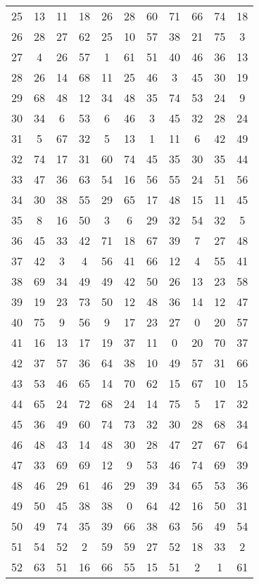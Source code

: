 \begin{table}
\begin{tabular}{c c c c c c c c c c c }
25 & 13 & 11 & 18 & 26 & 28 & 60 & 71 & 66 & 74 & 18 \\
26 & 28 & 27 & 62 & 25 & 10 & 57 & 38 & 21 & 75 & 3 \\
27 & 4 & 26 & 57 & 1 & 61 & 51 & 40 & 46 & 36 & 13 \\
28 & 26 & 14 & 68 & 11 & 25 & 46 & 3 & 45 & 30 & 19 \\
29 & 68 & 48 & 12 & 34 & 48 & 35 & 74 & 53 & 24 & 9 \\
30 & 34 & 6 & 53 & 6 & 46 & 3 & 45 & 32 & 28 & 24 \\
31 & 5 & 67 & 32 & 5 & 13 & 1 & 11 & 6 & 42 & 49 \\
32 & 74 & 17 & 31 & 60 & 74 & 45 & 35 & 30 & 35 & 44 \\
33 & 47 & 36 & 63 & 54 & 16 & 56 & 55 & 24 & 51 & 56 \\
34 & 30 & 38 & 55 & 29 & 65 & 17 & 48 & 15 & 11 & 45 \\
35 & 8 & 16 & 50 & 3 & 6 & 29 & 32 & 54 & 32 & 5 \\
36 & 45 & 33 & 42 & 71 & 18 & 67 & 39 & 7 & 27 & 48 \\
37 & 42 & 3 & 4 & 56 & 41 & 66 & 12 & 4 & 55 & 41 \\
38 & 69 & 34 & 49 & 49 & 42 & 50 & 26 & 13 & 23 & 58 \\
39 & 19 & 23 & 73 & 50 & 12 & 48 & 36 & 14 & 12 & 47 \\
40 & 75 & 9 & 56 & 9 & 17 & 23 & 27 & 0 & 20 & 57 \\
41 & 16 & 13 & 17 & 19 & 37 & 11 & 0 & 20 & 70 & 37 \\
42 & 37 & 57 & 36 & 64 & 38 & 10 & 49 & 57 & 31 & 66 \\
43 & 53 & 46 & 65 & 14 & 70 & 62 & 15 & 67 & 10 & 15 \\
44 & 65 & 24 & 72 & 68 & 24 & 14 & 75 & 5 & 17 & 32 \\
45 & 36 & 49 & 60 & 74 & 73 & 32 & 30 & 28 & 68 & 34 \\
46 & 48 & 43 & 14 & 48 & 30 & 28 & 47 & 27 & 67 & 64 \\
47 & 33 & 69 & 69 & 12 & 9 & 53 & 46 & 74 & 69 & 39 \\
48 & 46 & 29 & 61 & 46 & 29 & 39 & 34 & 65 & 53 & 36 \\
49 & 50 & 45 & 38 & 38 & 0 & 64 & 42 & 16 & 50 & 31 \\
50 & 49 & 74 & 35 & 39 & 66 & 38 & 63 & 56 & 49 & 54 \\
51 & 54 & 52 & 2 & 59 & 59 & 27 & 52 & 18 & 33 & 2 \\
52 & 63 & 51 & 16 & 66 & 55 & 15 & 51 & 2 & 1 & 61 \\

\end{tabular}
\end{table}

